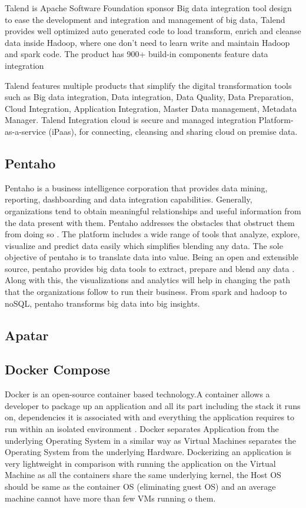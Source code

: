    Talend is Apache Software Foundation sponsor Big data integration
    tool design to ease the development and integration and management
    of big data, Talend provides well optimized auto generated code to
    load transform, enrich and cleanse data inside Hadoop, where one
    don’t need to learn write and maintain Hadoop and spark code.  The
    product has 900+ build-in components feature data integration
     
    Talend features multiple products that simplify the digital
    transformation tools such as Big data integration, Data
    integration, Data Quality, Data Preparation, Cloud Integration,
    Application Integration, Master Data management, Metadata Manager.
    Talend Integration cloud is secure and managed integration
    Platform-as-a-service (iPaas), for connecting, cleansing and
    sharing cloud on premise data.

\subsection{Pentaho}

    Pentaho is a business intelligence corporation that provides data
    mining, reporting, dashboarding and data integration
    capabilities. Generally, organizations tend to obtain meaningful
    relationships and useful information from the data present with
    them. Pentaho addresses the obstacles that obstruct them from
    doing so \cite{pent1}. The platform includes a wide range of
    tools that analyze, explore, visualize and predict data easily
    which simplifies blending any data. The sole objective of pentaho
    is to translate data into value. Being an open and extensible
    source, pentaho provides big data tools to extract, prepare and
    blend any data \cite{pent2}. Along with this, the visualizations
    and analytics will help in changing the path that the
    organizations follow to run their business. From spark and hadoop
    to noSQL, pentaho transforms big data into big insights.

\subsection{Apatar}
\subsection{Docker Compose}

    Docker is an open-source container based technology.A container
    allows a developer to package up an application and all its part
    including the stack it runs on, dependencies it is associated with
    and everything the application requires to run within an isolated
    environment . Docker separates Application from the underlying
    Operating System in a similar way as Virtual Machines separates
    the Operating System from the underlying Hardware. Dockerizing an
    application is very lightweight in comparison with running the
    application on the Virtual Machine as all the containers share the
    same underlying kernel, the Host OS should be same as the
    container OS (eliminating guest OS) and an average machine cannot
    have more than few VMs running o them.

